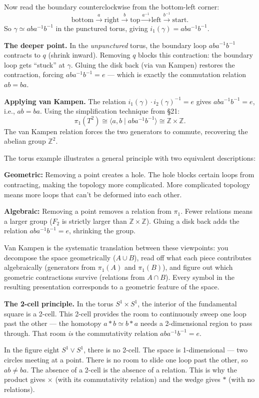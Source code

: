 \documentclass[11pt]{report}
\begin{document}
\begin{exbox}
Now read the boundary counterclockwise from the bottom-left corner:
\[\text{bottom} \xrightarrow{a} \text{right} \xrightarrow{b} \text{top} \xrightarrow{a^{-1}} \text{left} \xrightarrow{b^{-1}} \text{start}.\]
So $\gamma \simeq aba^{-1}b^{-1}$ in the punctured torus, giving $i_1(\gamma) = aba^{-1}b^{-1}$.

\textbf{The deeper point.} In the \emph{unpunctured} torus, the boundary loop $aba^{-1}b^{-1}$ contracts to $q$ (shrink inward). Removing $q$ blocks this contraction: the boundary loop gets ``stuck'' at $\gamma$. Gluing the disk back (via van Kampen) restores the contraction, forcing $aba^{-1}b^{-1} = e$ --- which is exactly the commutation relation $ab = ba$.

\textbf{Applying van Kampen.} The relation $i_1(\gamma) \cdot i_2(\gamma)^{-1} = e$ gives $aba^{-1}b^{-1} = e$, i.e., $ab = ba$. Using the simplification technique from \S 21:
\[\pi_1(T^2) \cong \langle a, b \mid aba^{-1}b^{-1} \rangle \cong \mathbb{Z} \times \mathbb{Z}.\]
The van Kampen relation forces the two generators to commute, recovering the abelian group $\mathbb{Z}^2$.
\end{exbox}

\begin{rembox}
The torus example illustrates a general principle with two equivalent descriptions:

\textbf{Geometric:} Removing a point creates a hole. The hole blocks certain loops from contracting, making the topology more complicated. More complicated topology means more loops that can't be deformed into each other.

\textbf{Algebraic:} Removing a point removes a relation from $\pi_1$. Fewer relations means a larger group ($F_2$ is strictly larger than $\mathbb{Z} \times \mathbb{Z}$). Gluing a disk back adds the relation $aba^{-1}b^{-1} = e$, shrinking the group.

Van Kampen is the systematic translation between these viewpoints: you decompose the space geometrically ($A \cup B$), read off what each piece contributes algebraically (generators from $\pi_1(A)$ and $\pi_1(B)$), and figure out which geometric contractions survive (relations from $A \cap B$). Every symbol in the resulting presentation corresponds to a geometric feature of the space.

\textbf{The 2-cell principle.} In the torus $S^1 \times S^1$, the interior of the fundamental square is a 2-cell. This 2-cell provides the room to continuously sweep one loop past the other --- the homotopy $a * b \simeq b * a$ needs a 2-dimensional region to pass through. That room \emph{is} the commutativity relation $aba^{-1}b^{-1} = e$.

In the figure eight $S^1 \vee S^1$, there is no 2-cell. The space is 1-dimensional --- two circles meeting at a point. There is no room to slide one loop past the other, so $ab \neq ba$. The absence of a 2-cell is the absence of a relation. This is why the product gives $\times$ (with its commutativity relation) and the wedge gives $*$ (with no relations).
\end{rembox}
\end{document}

